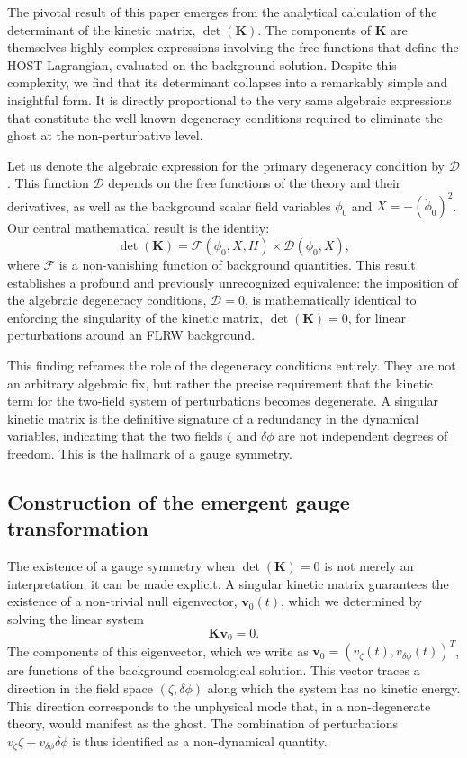 \documentclass[twocolumn]{aastex631}
\begin{document}
The pivotal result of this paper emerges from the analytical calculation of the determinant of the kinetic matrix, $\det(\mathbf{K})$. The components of $\mathbf{K}$ are themselves highly complex expressions involving the free functions that define the HOST Lagrangian, evaluated on the background solution. Despite this complexity, we find that its determinant collapses into a remarkably simple and insightful form. It is directly proportional to the very same algebraic expressions that constitute the well-known degeneracy conditions required to eliminate the ghost at the non-perturbative level.

Let us denote the algebraic expression for the primary degeneracy condition by $\mathcal{D}$. This function $\mathcal{D}$ depends on the free functions of the theory and their derivatives, as well as the background scalar field variables $\phi_0$ and $X = -(\dot{\phi}_0)^2$. Our central mathematical result is the identity:
\begin{equation}
\det(\mathbf{K}) = \mathcal{F}(\phi_0, X, H) \times \mathcal{D}(\phi_0, X),
\end{equation}
where $\mathcal{F}$ is a non-vanishing function of background quantities. This result establishes a profound and previously unrecognized equivalence: the imposition of the algebraic degeneracy conditions, $\mathcal{D}=0$, is mathematically identical to enforcing the singularity of the kinetic matrix, $\det(\mathbf{K})=0$, for linear perturbations around an FLRW background.

This finding reframes the role of the degeneracy conditions entirely. They are not an arbitrary algebraic fix, but rather the precise requirement that the kinetic term for the two-field system of perturbations becomes degenerate. A singular kinetic matrix is the definitive signature of a redundancy in the dynamical variables, indicating that the two fields $\zeta$ and $\delta\phi$ are not independent degrees of freedom. This is the hallmark of a gauge symmetry.

\subsection{Construction of the emergent gauge transformation}

The existence of a gauge symmetry when $\det(\mathbf{K})=0$ is not merely an interpretation; it can be made explicit. A singular kinetic matrix guarantees the existence of a non-trivial null eigenvector, $\mathbf{v}_0(t)$, which we determined by solving the linear system
\begin{equation}
\mathbf{K} \mathbf{v}_0 = 0.
\end{equation}
The components of this eigenvector, which we write as $\mathbf{v}_0 = (v_\zeta(t), v_{\delta\phi}(t))^T$, are functions of the background cosmological solution. This vector traces a direction in the field space $(\zeta, \delta\phi)$ along which the system has no kinetic energy. This direction corresponds to the unphysical mode that, in a non-degenerate theory, would manifest as the ghost. The combination of perturbations $v_\zeta \zeta + v_{\delta\phi} \delta\phi$ is thus identified as a non-dynamical quantity.
\end{document}
